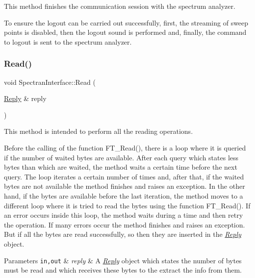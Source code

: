 This method finishes the communication session with the spectrum analyzer. 

To ensure the logout can be carried out successfully, first, the streaming of sweep points is disabled, then the logout sound is performed and, finally, the command to logout is sent to the spectrum analyzer. \mbox{\label{classSpectranInterface_a63c61d4d26c5aa335c6a20f469f3ec00}} 
\subsubsection{\texorpdfstring{Read()}{Read()}}
{\footnotesize\ttfamily void Spectran\+Interface\+::\+Read (\begin{DoxyParamCaption}\item[{\hyperlink{classReply}{Reply} \&}]{reply }\end{DoxyParamCaption})\hspace{0.3cm}{\ttfamily [inline]}}



This method is intended to perform all the reading operations. 

Before the calling of the function {\ttfamily F\+T\+\_\+\+Read()}, there is a loop where it is queried if the number of waited bytes are available. After each query which states less bytes than which are waited, the method waits a certain time before the next query. The loop iterates a certain number of times and, after that, if the waited bytes are not available the method finishes and raises an exception. In the other hand, if the bytes are available before the last iteration, the method moves to a different loop where it is tried to read the bytes using the function {\ttfamily F\+T\+\_\+\+Read()}. If an error occurs inside this loop, the method waits during a time and then retry the operation. If many errors occur the method finishes and raises an exception. But if all the bytes are read successfully, so then they are inserted in the {\itshape \hyperlink{classReply}{Reply}} object. 
\begin{DoxyParams}[1]{Parameters}
\mbox{\tt in,out}  & {\em reply} & A {\itshape \hyperlink{classReply}{Reply}} object which states the number of bytes must be read and which receives these bytes to the extract the info from them. \\
\hline
\end{DoxyParams}
\mbox{\label{classSpectranInterface_a512218c4f1589c32b4fd9a0f7ad5e8cc}} 
